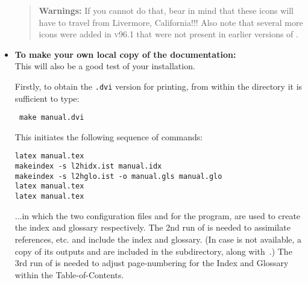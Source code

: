 \begin{itemize}
%
\begin{quotation}\noindent
\textbf{Warnings: }%
If you cannot do that, bear in mind that these icons will have
to travel from Livermore, California!!!
Also note that several more icons were added in \textsc{v96.1}
that were not present in earlier versions of \latextohtml.
\end{quotation}

%
%
\item
\textbf{To make your own local copy of the \latextohtml{}
documentation:} \\
This will also be a good test of your installation.
%
%
\begin{changebar}%
\noindent
Firstly, to obtain the \texttt{.dvi} version for printing,
from within the  directory it is sufficient to type:

\begin{small}
\texttt{ make manual.dvi}
\end{small}

\noindent
This initiates the following sequence of commands:
\begin{small}
\begin{verbatim}
latex manual.tex
makeindex -s l2hidx.ist manual.idx
makeindex -s l2hglo.ist -o manual.gls manual.glo
latex manual.tex
latex manual.tex
\end{verbatim}
\end{small}
%
%
...in which the two configuration files  and 
for the  program, are used to create the index and glossary respectively.
The 2nd run of  is needed to assimilate references, etc.
and include the index and glossary.\html{\\}%
%
\html{\\}
(In case  is not available, a copy of its outputs 
and  are included in the  subdirectory,
along with \,.)\html{\\}
The 3rd run of  is needed to adjust page-numbering for the Index
and Glossary within the Table-of-Contents.


\end{changebar}
\end{itemize}
